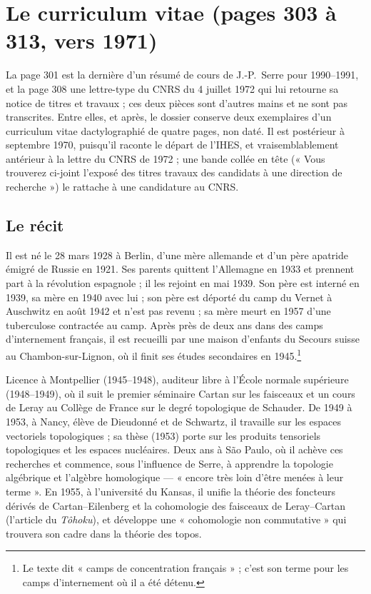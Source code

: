 \documentclass[11pt,a4paper]{article}
\begin{document}
\section*{Le curriculum vitae (pages 303 à 313, vers 1971)}

La page 301 est la dernière d'un résumé de cours de J.-P.~Serre pour
1990--1991, et la page 308 une lettre-type du CNRS du 4 juillet 1972 qui lui
retourne sa notice de titres et travaux ; ces deux pièces sont d'autres
mains et ne sont pas transcrites. Entre elles, et après, le dossier conserve
deux exemplaires d'un curriculum vitae dactylographié de quatre pages, non
daté. Il est postérieur à septembre 1970, puisqu'il raconte le départ de
l'IHES, et vraisemblablement antérieur à la lettre du CNRS de 1972 ; une
bande collée en tête (« Vous trouverez ci-joint l'exposé des titres travaux
des candidats à une direction de recherche ») le rattache à une candidature
au CNRS.

\subsection*{Le récit}

Il est né le 28 mars 1928 à Berlin, d'une mère allemande et d'un père
apatride émigré de Russie en 1921. Ses parents quittent l'Allemagne en 1933
et prennent part à la révolution espagnole ; il les rejoint en mai 1939. Son
père est interné en 1939, sa mère en 1940 avec lui ; son père est déporté du
camp du Vernet à Auschwitz en août 1942 et n'est pas revenu ; sa mère meurt
en 1957 d'une tuberculose contractée au camp. Après près de deux ans dans
des camps d'internement français, il est recueilli par une maison d'enfants
du Secours suisse au Chambon-sur-Lignon, où il finit ses études secondaires
en 1945.\footnote{Le texte dit « camps de concentration français » ; c'est
son terme pour les camps d'internement où il a été détenu.}

Licence à Montpellier (1945--1948), auditeur libre à l'École normale
supérieure (1948--1949), où il suit le premier séminaire Cartan sur les
faisceaux et un cours de Leray au Collège de France sur le degré topologique
de Schauder. De 1949 à 1953, à Nancy, élève de Dieudonné et de Schwartz, il
travaille sur les espaces vectoriels topologiques ; sa thèse (1953) porte sur
les produits tensoriels topologiques et les espaces nucléaires. Deux ans à
São Paulo, où il achève ces recherches et commence, sous l'influence de Serre,
à apprendre la topologie algébrique et l'algèbre homologique — « encore très
loin d'être menées à leur terme ». En 1955, à l'université du Kansas, il
unifie la théorie des foncteurs dérivés de Cartan--Eilenberg et la cohomologie
des faisceaux de Leray--Cartan (l'article du \emph{Tôhoku}), et développe une
« cohomologie non commutative » qui trouvera son cadre dans la théorie des
topos.
\end{document}
